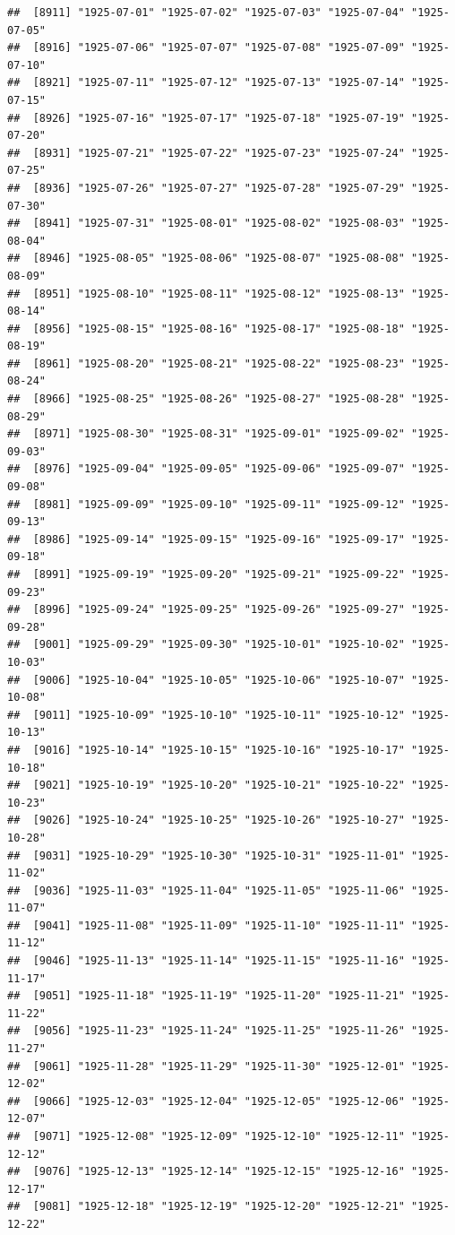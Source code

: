 \documentclass{article}\usepackage[]{graphicx}\usepackage[]{color}
\makeatletter
\newenvironment{kframe}{%
 \def\at@end@of@kframe{}%
 \ifinner\ifhmode%
  \def\at@end@of@kframe{\end{minipage}}%
  \begin{minipage}{\columnwidth}%
 \fi\fi%
 \def\FrameCommand##1{\hskip\@totalleftmargin \hskip-\fboxsep
 \colorbox{shadecolor}{##1}\hskip-\fboxsep
     \hskip-\linewidth \hskip-\@totalleftmargin \hskip\columnwidth}%
 \MakeFramed {\advance\hsize-\width
   \@totalleftmargin\z@ \linewidth\hsize
   \@setminipage}}%
 {\par\unskip\endMakeFramed%
 \at@end@of@kframe}
\newenvironment{knitrout}{}{} %
\makeatother
\begin{document}
\begin{description}
\begin{knitrout}
\begin{kframe}
\begin{verbatim}
##  [8911] "1925-07-01" "1925-07-02" "1925-07-03" "1925-07-04" "1925-07-05"
##  [8916] "1925-07-06" "1925-07-07" "1925-07-08" "1925-07-09" "1925-07-10"
##  [8921] "1925-07-11" "1925-07-12" "1925-07-13" "1925-07-14" "1925-07-15"
##  [8926] "1925-07-16" "1925-07-17" "1925-07-18" "1925-07-19" "1925-07-20"
##  [8931] "1925-07-21" "1925-07-22" "1925-07-23" "1925-07-24" "1925-07-25"
##  [8936] "1925-07-26" "1925-07-27" "1925-07-28" "1925-07-29" "1925-07-30"
##  [8941] "1925-07-31" "1925-08-01" "1925-08-02" "1925-08-03" "1925-08-04"
##  [8946] "1925-08-05" "1925-08-06" "1925-08-07" "1925-08-08" "1925-08-09"
##  [8951] "1925-08-10" "1925-08-11" "1925-08-12" "1925-08-13" "1925-08-14"
##  [8956] "1925-08-15" "1925-08-16" "1925-08-17" "1925-08-18" "1925-08-19"
##  [8961] "1925-08-20" "1925-08-21" "1925-08-22" "1925-08-23" "1925-08-24"
##  [8966] "1925-08-25" "1925-08-26" "1925-08-27" "1925-08-28" "1925-08-29"
##  [8971] "1925-08-30" "1925-08-31" "1925-09-01" "1925-09-02" "1925-09-03"
##  [8976] "1925-09-04" "1925-09-05" "1925-09-06" "1925-09-07" "1925-09-08"
##  [8981] "1925-09-09" "1925-09-10" "1925-09-11" "1925-09-12" "1925-09-13"
##  [8986] "1925-09-14" "1925-09-15" "1925-09-16" "1925-09-17" "1925-09-18"
##  [8991] "1925-09-19" "1925-09-20" "1925-09-21" "1925-09-22" "1925-09-23"
##  [8996] "1925-09-24" "1925-09-25" "1925-09-26" "1925-09-27" "1925-09-28"
##  [9001] "1925-09-29" "1925-09-30" "1925-10-01" "1925-10-02" "1925-10-03"
##  [9006] "1925-10-04" "1925-10-05" "1925-10-06" "1925-10-07" "1925-10-08"
##  [9011] "1925-10-09" "1925-10-10" "1925-10-11" "1925-10-12" "1925-10-13"
##  [9016] "1925-10-14" "1925-10-15" "1925-10-16" "1925-10-17" "1925-10-18"
##  [9021] "1925-10-19" "1925-10-20" "1925-10-21" "1925-10-22" "1925-10-23"
##  [9026] "1925-10-24" "1925-10-25" "1925-10-26" "1925-10-27" "1925-10-28"
##  [9031] "1925-10-29" "1925-10-30" "1925-10-31" "1925-11-01" "1925-11-02"
##  [9036] "1925-11-03" "1925-11-04" "1925-11-05" "1925-11-06" "1925-11-07"
##  [9041] "1925-11-08" "1925-11-09" "1925-11-10" "1925-11-11" "1925-11-12"
##  [9046] "1925-11-13" "1925-11-14" "1925-11-15" "1925-11-16" "1925-11-17"
##  [9051] "1925-11-18" "1925-11-19" "1925-11-20" "1925-11-21" "1925-11-22"
##  [9056] "1925-11-23" "1925-11-24" "1925-11-25" "1925-11-26" "1925-11-27"
##  [9061] "1925-11-28" "1925-11-29" "1925-11-30" "1925-12-01" "1925-12-02"
##  [9066] "1925-12-03" "1925-12-04" "1925-12-05" "1925-12-06" "1925-12-07"
##  [9071] "1925-12-08" "1925-12-09" "1925-12-10" "1925-12-11" "1925-12-12"
##  [9076] "1925-12-13" "1925-12-14" "1925-12-15" "1925-12-16" "1925-12-17"
##  [9081] "1925-12-18" "1925-12-19" "1925-12-20" "1925-12-21" "1925-12-22"

\end{verbatim}
\end{kframe}
\end{knitrout}
\end{description}
\end{document}
